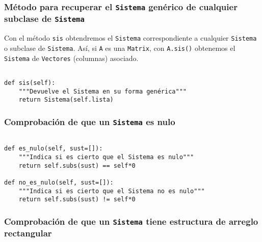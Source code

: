 \documentclass[11pt]{report}
\begin{document}
\subsubsection{Método para recuperar el \texttt{Sistema} genérico de cualquier subclase de \texttt{Sistema}}
\label{sec:orga42f98d}

Con el método \texttt{sis} obtendremos el \texttt{Sistema} correspondiente a
cualquier \texttt{Sistema} o subclase de \texttt{Sistema}. Así, si \texttt{A} es una
\texttt{Matrix}, con \texttt{A.sis()} obtenemos el \texttt{Sistema} de \texttt{Vectores}
(columnas) asociado.
\begin{verbatim}

def sis(self):
    """Devuelve el Sistema en su forma genérica"""
    return Sistema(self.lista)

\end{verbatim}

\subsubsection{Comprobación de que un \texttt{Sistema} es nulo}
\label{sec:org41dbff5}

\begin{verbatim}

def es_nulo(self, sust=[]):
    """Indica si es cierto que el Sistema es nulo"""
    return self.subs(sust) == self*0

def no_es_nulo(self, sust=[]):
    """Indica si es cierto que el Sistema no es nulo"""
    return self.subs(sust) != self*0

\end{verbatim}

\subsubsection{Comprobación de que un \texttt{Sistema}  tiene estructura de arreglo rectangular}
\label{sec:orgb8f6b6e}
\end{document}
